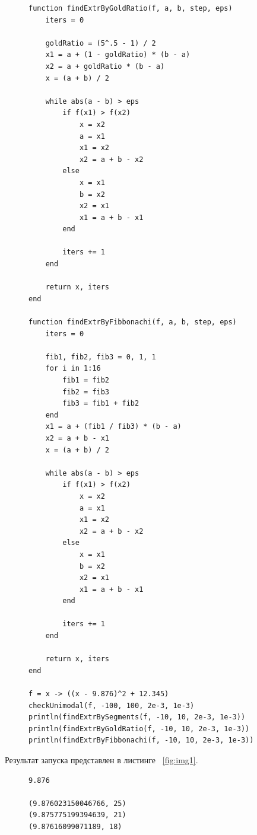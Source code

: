 \documentclass[a4paper, 14pt]{extarticle}
\begin{document}
\begin{figure}[!htb]
\begin{lstlisting}[language={},caption={Нахождение минимумов функции},label={lst:code1}]
function findExtrByGoldRatio(f, a, b, step, eps)
    iters = 0

    goldRatio = (5^.5 - 1) / 2
    x1 = a + (1 - goldRatio) * (b - a)
    x2 = a + goldRatio * (b - a)
    x = (a + b) / 2

    while abs(a - b) > eps
        if f(x1) > f(x2)
            x = x2
            a = x1
            x1 = x2
            x2 = a + b - x2
        else
            x = x1
            b = x2
            x2 = x1
            x1 = a + b - x1
        end

        iters += 1
    end

    return x, iters
end

function findExtrByFibbonachi(f, a, b, step, eps)
    iters = 0

    fib1, fib2, fib3 = 0, 1, 1
    for i in 1:16
        fib1 = fib2
        fib2 = fib3
        fib3 = fib1 + fib2
    end
    x1 = a + (fib1 / fib3) * (b - a)
    x2 = a + b - x1
    x = (a + b) / 2

    while abs(a - b) > eps
        if f(x1) > f(x2)
            x = x2
            a = x1
            x1 = x2
            x2 = a + b - x2
        else
            x = x1
            b = x2
            x2 = x1
            x1 = a + b - x1
        end

        iters += 1
    end

    return x, iters
end

f = x -> ((x - 9.876)^2 + 12.345)
checkUnimodal(f, -100, 100, 2e-3, 1e-3)
println(findExtrBySegments(f, -10, 10, 2e-3, 1e-3))
println(findExtrByGoldRatio(f, -10, 10, 2e-3, 1e-3))
println(findExtrByFibbonachi(f, -10, 10, 2e-3, 1e-3))
\end{lstlisting}
\end{figure}

Результат запуска представлен в листинге ~\ref{fig:img1}.

\begin{figure}[!htb]
\begin{lstlisting}[language={},caption={Нахождение минимумов функции},label={lst:code1}]
9.876

(9.876023150046766, 25)
(9.875775199394639, 21)
(9.87616099071189, 18)
\end{lstlisting}
\end{figure}
\end{document}
